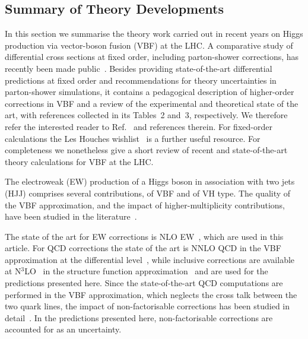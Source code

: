 \subsection{Summary of Theory Developments}
In this section we summarise the theory work carried out in recent years on
Higgs production via vector-boson fusion (VBF) at the LHC. A comparative study
of differential cross sections at fixed order, including parton-shower
corrections, has recently been made public~\cite{Barone:2025jey}. Besides
providing state-of-the-art differential predictions at fixed order and
recommendations for theory uncertainties in parton-shower simulations, it
contains a pedagogical description of higher-order corrections in VBF and a
review of the experimental and theoretical state of the art, with references
collected in its Tables~2 and~3, respectively. We therefore refer the interested
reader to Ref.~\cite{Barone:2025jey} and references therein. For fixed-order
calculations the Les Houches wishlist~\cite{Huss:2025nlt} is a further useful
resource. For completeness we nonetheless give a short review of recent and
state-of-the-art theory calculations for VBF at the LHC.

The electroweak (EW) production of a Higgs boson in association with two jets
(HJJ) comprises several contributions, of VBF and of VH type. The quality of
the VBF approximation, and the impact of higher-multiplicity contributions,
have been studied in the
literature~\cite{Figy:2003nv,Berger:2004pca,Ciccolini:2007jr,Bolzoni:2011cu,
Campanario:2013fsa,Campanario:2018ppz,Barone:2025jey}.

The state of the art for EW corrections is NLO
EW~\cite{Ciccolini:2007jr,Ciccolini:2007ec}, which are used in this article.
For QCD corrections the state of the art is NNLO QCD in the VBF approximation
at the differential level~\cite{Cacciari:2015jma,Cruz-Martinez:2018rod,Asteriadis:2021gpd}, while
inclusive corrections are available at N$^3$LO~\cite{Dreyer:2016oyx} in the structure function approximation~\cite{Han:1992hr,Bolzoni:2010xr,Bolzoni:2011cu} and are
used for the predictions presented here. Since the state-of-the-art QCD
computations are performed in the VBF approximation, which neglects the cross
talk between the two quark lines, the impact of non-factorisable corrections
has been studied in detail~\cite{Liu:2019tuy,Dreyer:2020urf,Asteriadis:2023nyl,
Bronnum-Hansen:2023vzh,Long:2023mvc,Gates:2023iiv}. In the predictions
presented here, non-factorisable corrections are accounted for as an uncertainty.

